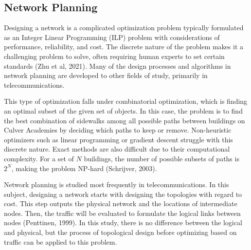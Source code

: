 \documentclass[11pt]{article}
\begin{document}
\subsection{Network Planning}
Designing a network is a complicated optimization problem typically formulated as an Integer Linear Programming (ILP) problem with considerations of performance, reliability, and cost. The discrete nature of the problem makes it a challenging problem to solve, often requiring human experts to set certain standards (Zhu et al, 2021). Many of the design processes and algorithms in network planning are developed to other fields of study, primarily in telecommunications.\par
This type of optimization falls under combinatorial optimization, which is finding an optimal subset of the given set of objects. In this case, the problem is to find the best combination of sidewalks among all possible paths between buildings on Culver Academies by deciding which paths to keep or remove. Non-heuristic optimizers such as linear programming or gradient descent struggle with this discrete nature. Exact methods are also difficult due to their computational complexity. For a set of $N$ buildings, the number of possible subsets of paths is $2^N$, making the problem NP-hard (Schrijver, 2003). \par
Network planning is studied most frequently in telecommunications. In this subject, designing a network starts with designing the topologies with regard to cost. This step outputs the physical network and the locations of intermediate nodes. Then, the traffic will be evaluated to formulate the logical links between nodes (Penttinen, 1999). In this study, there is no difference between the logical and physical, but the process of topological design before optimizing based on traffic can be applied to this problem. \par
\end{document}
